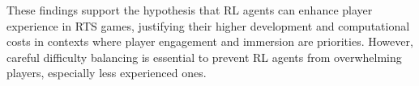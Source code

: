 \documentclass[conference]{IEEEtran}
\begin{document}
These findings support the hypothesis that RL agents can enhance player experience in RTS games, justifying their higher development and computational costs in contexts where player engagement and
immersion are priorities. However, careful difficulty balancing is essential to prevent RL agents from overwhelming players, especially less experienced ones.










\end{document}
